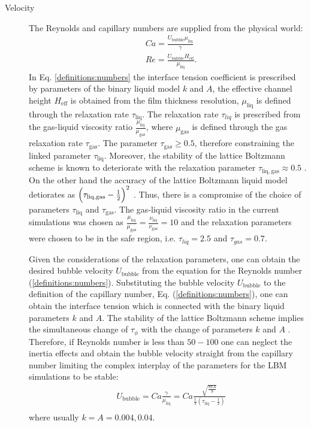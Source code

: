 \documentclass{article}
\begin{document}
\begin{description}
\item[Velocity] The Reynolds and capillary numbers are supplied from the physical world:
\begin{equation}
\label{definitions:numbers}
\begin{aligned}
&Ca=\frac{U_{\mathrm{bubble}} \mu_{\mathrm{liq}}}{\gamma} \\
&Re=\frac{U_{\mathrm{bubble}} H_{\mathrm{eff}}}{\mu_{\mathrm{liq}}}.
\end{aligned}
\end{equation}
In Eq. \eqref{definitions:numbers} the interface tension coefficient is prescribed by parameters of
the binary liquid model $k$ and $A$, the effective channel height $H_{\mathrm{eff}}$ is obtained
from the film thickness resolution, $\mu_{\mathrm{liq}}$ is defined through the relaxation rate
$\tau_{\mathrm{liq}}$. The relaxation rate $\tau_{liq}$ is prescribed from the gas-liquid viscosity
ratio $\frac{\mu_{\mathrm{liq}}}{\mu_{\mathrm{gas}}}$, where $\mu_{\mathrm{gas}}$ is defined through
the gas relaxation rate $\tau_{\mathrm{gas}}$. The parameter $\tau_{\mathrm{gas}}\geq 0.5$, therefore
 constraining the linked parameter $\tau_{\mathrm{liq}}$. Moreover,
the stability of the lattice Boltzmann scheme is known to deteriorate with the relaxation parameter
$\tau_{\mathrm{liq},\mathrm{gas}}\approx 0.5$ \cite{kuzmin-trt-stability}. On the other hand the
accuracy of the lattice Boltzmann liquid model detiorates as
$\Bigl(\tau_{\mathrm{liq},\mathrm{gas}}-\frac{1}{2}\Bigr)^2$ \cite{ginzburg-trt-simple-hydro}. Thus,
there is a compromise of the choice of parameters $\tau_{\mathrm{liq}}$ and $\tau_{\mathrm{gas}}$.
The gas-liquid viscosity ratio in the current simulations was chosen as
$\frac{\mu_{\mathrm{liq}}}{\mu_{\mathrm{gas}}}=\frac{\nu_{\mathrm{liq}}}{\nu_{\mathrm{gas}}}=10$ and
the relaxation parameters were chosen to be
in the safe region, i.e. $\tau_{liq}=2.5$ and $\tau_{gas}=0.7$. 

Given the considerations of the relaxation parameters, one can obtain the desired bubble velocity
$U_{\mathrm{bubble}}$ from the equation for the Reynolds number (\ref{definitions:numbers}).
Substituting the bubble velocity $U_{\mathrm{bubble}}$ to the definition of the capillary number,
Eq. (\ref{definitions:numbers}), one can obtain the interface tension which is connected with the
binary liquid parameters $k$ and $A$. The stability of the lattice Boltzmann scheme implies the
simultaneous change of $\tau_{\phi}$ with the change of parameters $k$ and $A$
\cite{pagonabarraga-parameters}. Therefore, if Reynolds number is less than
$50-100$ one can neglect the inertia effects and obtain the bubble velocity straight from the
capillary number limiting the complex interplay of the parameters for the LBM simulations to be
stable: 
\begin{equation}
\begin{aligned}
&U_{\mathrm{bubble}}=Ca \frac{\gamma}{\mu_{\mathrm{liq}}}=Ca \frac{\sqrt{\frac{8 k
A}{9}}}{\frac{1}{3}(\tau_{\mathrm{liq}}-\frac{1}{2})}\\
\end{aligned}
\end{equation}
where usually $k=A=0.004,0.04$.


\end{description}
\end{document}
